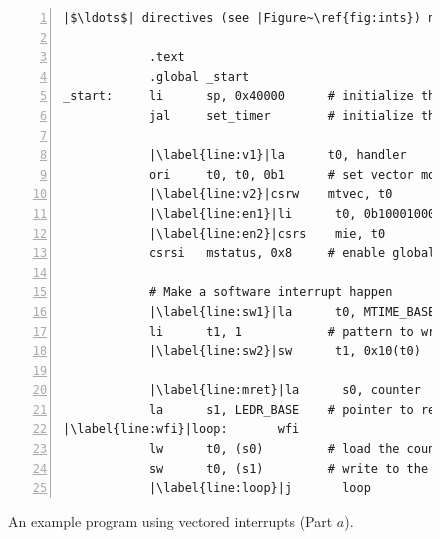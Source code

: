 \documentclass[11pt, twoside, pdftex]{article}
\begin{document}
\begin{figure}[H]
\begin{center}
\begin{minipage}[h]{15 cm}
\begin{lstlisting}[style=defaultNiosVStyle, name=vecs, numbers=left, escapechar=|]
            |$\ldots$| directives (see |Figure~\ref{fig:ints}) not| shown

            .text
            .global _start
_start:     li      sp, 0x40000      # initialize the stack location
            jal     set_timer        # initialize the timer 
     
            |\label{line:v1}|la      t0, handler      # get handler address
            ori     t0, t0, 0b1      # set vector mode
            |\label{line:v2}|csrw    mtvec, t0        # set trap address and mode
            |\label{line:en1}|li      t0, 0b10001000   # set the enable pattern
            |\label{line:en2}|csrs    mie, t0          # timer & software interrupts
            csrsi   mstatus, 0x8     # enable global interrupts

            # Make a software interrupt happen
            |\label{line:sw1}|la      t0, MTIME_BASE   # base address
            li      t1, 1            # pattern to write to msip
            |\label{line:sw2}|sw      t1, 0x10(t0)     # write to msip (sw interrupt)

            |\label{line:mret}|la      s0, counter      # pointer to counter
            la      s1, LEDR_BASE    # pointer to red lights
|\label{line:wfi}|loop:       wfi
            lw      t0, (s0)         # load the counter value
            sw      t0, (s1)         # write to the lights
            |\label{line:loop}|j       loop
\end{lstlisting}
	\caption{An example program using vectored interrupts (Part $a$).}
	\label{fig:vectored}
\end{minipage}
\end{center}
\end{figure}
\end{document}
